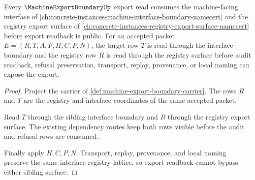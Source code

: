 \begin{theorem}
\label{thm:machine-export-boundary-interface-registry-lattice-route}
Every $\MachineExportBoundaryUp$ export read consumes the machine-facing interface of \autoref{ch:concrete-instances-machine-interface-boundary-namecert} and the registry export surface of \autoref{ch:concrete-instances-registry-export-surface-namecert} before export readback is public. For an accepted packet $E=(R,T,A,F,H,C,P,N)$, the target row $T$ is read through the interface boundary and the registry row $R$ is read through the registry surface before audit readback, refusal preservation, transport, replay, provenance, or local naming can expose the export.
\end{theorem}
\begin{proof}
Project the carrier of \autoref{def:machine-export-boundary-carrier}. The rows $R$ and $T$ are the registry and interface coordinates of the same accepted packet.

Read $T$ through the sibling interface boundary and $R$ through the registry export surface. The existing dependency routes keep both rows visible before the audit and refusal rows are consumed.

Finally apply $H,C,P,N$. Transport, replay, provenance, and local naming preserve the same interface-registry lattice, so export readback cannot bypass either sibling surface.
\end{proof}
